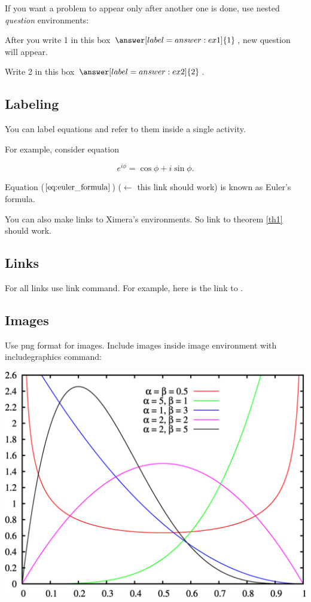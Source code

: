 \documentclass{ximera}
\begin{document}
If you want a problem to appear only after another one is done, use nested {\it question} environments:

\begin{problem}
After you write 1 in this box $\answer[label=answer:ex1]{1}$, new question will appear.

\begin{problem}
Write 2 in this box $\answer[label=answer:ex2]{2}$.
\end{problem}

\end{problem}


\subsection*{Labeling}

You can label equations and refer to them inside a single activity.

For example, consider equation

\begin{equation}\label{eq:euler_formula}
e^{i \phi} = \cos \phi + i \sin \phi.
\end{equation}

Equation ($\ref{eq:euler_formula}$) ($\leftarrow$ this link should work) is known as Euler's formula.

You can also make links to Ximera's environments.
So link to theorem \ref{th1} should work.

\subsection*{Links}

For all links use {\sf link} command.
For example, here is the link to .

\subsection*{Images}

Use {\sf png} format for images.
Include images inside  {\sf image} environment with {\sf includegraphics} command:
\begin{image}
\includegraphics{graphic.png}
\end{image}
\end{document}
